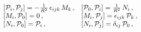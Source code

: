 \begin{equation}\label{llm3.13}
\begin{array}{ll}
 [{\cal P}_i , {\cal P}_j ] = - \frac{1}{R^2} \, \epsilon_{ijk}\, M_k\, ,
& [{\cal P}_0 , {\cal P}_i ] =  \frac{1}{R^2} \, N_i\, ,
 \cr [M_i
, {\cal P}_0 ] = 0 \, , &[{M}_i , {\cal P}_j ] = \epsilon_{ijk}\,
{\cal P}_k\, ,
\cr [N_i ,{\cal  P}_0 ] =  {\cal P}_i \, , &[N_i , {\cal
P}_j] = \delta_{ij} \,   {\cal P}_0 \, ,
\end{array}
\end{equation}

